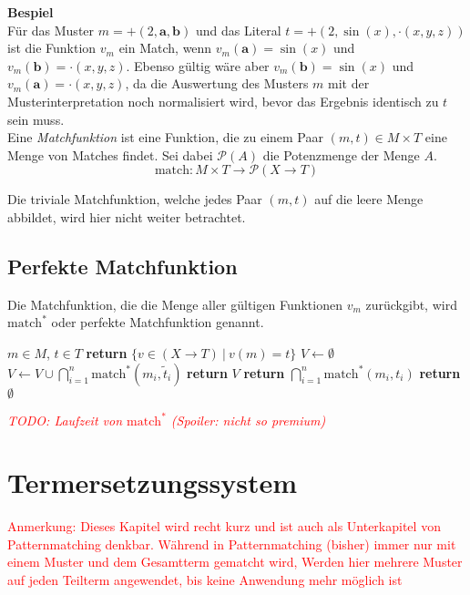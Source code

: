 \documentclass{scrartcl}
\begin{document}
\textbf{Bespiel}\\
Für das Muster $m = +(2, \mathbf a, \mathbf b)$ und das Literal $t = +(2, \sin(x), \cdot(x, y, z))$ ist die Funktion $v_m$ ein Match, wenn $v_m(\mathbf a) = \sin(x)$ und $v_m(\mathbf b) = \cdot(x, y, z)$. Ebenso gültig wäre aber $v_m(\mathbf b) = \sin(x)$ und $v_m(\mathbf a) = \cdot(x, y, z)$, da die Auswertung des Musters $m$ mit der Musterinterpretation noch normalisiert wird, bevor das Ergebnis identisch zu $t$ sein muss.\\

Eine \emph{Matchfunktion} ist eine Funktion, die zu einem Paar $(m, t) \in M \times T$ eine Menge von Matches findet. Sei dabei $\mathcal{P}(A)$ die Potenzmenge der Menge $A$.
$$\mathrm{match} \colon M \times T \rightarrow \mathcal{P}(X \rightarrow T)$$

Die triviale Matchfunktion, welche jedes Paar $(m, t)$ auf die leere Menge abbildet, wird hier nicht weiter betrachtet.

\subsection{Perfekte Matchfunktion}
Die Matchfunktion, die die Menge aller gültigen Funktionen $v_m$ zurückgibt, wird $\mathrm{match}^*$ oder perfekte Matchfunktion genannt.

\begin{algorithm}
\caption{$\mathrm{match}^* \colon M \times T \rightarrow \mathcal{P}(X \rightarrow T)$}\label{perfectMatch}
\begin{algorithmic}[1] %
\Require $m \in M$, $t \in T$
	\State \textbf{return} $\{v \in (X \rightarrow T) ~|~ v(m) = t\}$ 
\EndIf
{}
		\State $V \leftarrow \emptyset$
			\State $V \leftarrow V \cup \bigcap_{i = 1}^n {\mathrm{match}^*(m_i, \tilde t_i)}$
		\EndFor
		\State \textbf{return} $V$
	\Else
		\State \textbf{return} $\bigcap_{i = 1}^n {\mathrm{match}^*(m_i, t_i)}$
	\EndIf
\EndIf
\State \textbf{return} $\emptyset$
\end{algorithmic}
\end{algorithm}
\textcolor{red}{\textit{TODO: Laufzeit von $\mathrm{match}^*$ (Spoiler: nicht so premium)}}

\section{Termersetzungssystem}
\textcolor{red}{
\begin{itshape}
Anmerkung: Dieses Kapitel wird recht kurz und ist auch als Unterkapitel von Patternmatching denkbar. 
Während in Patternmatching (bisher) immer nur mit einem Muster und dem Gesamtterm gematcht wird, Werden hier mehrere Muster auf jeden Teilterm angewendet, bis keine Anwendung mehr möglich ist
\end{itshape}
}
\end{document}
